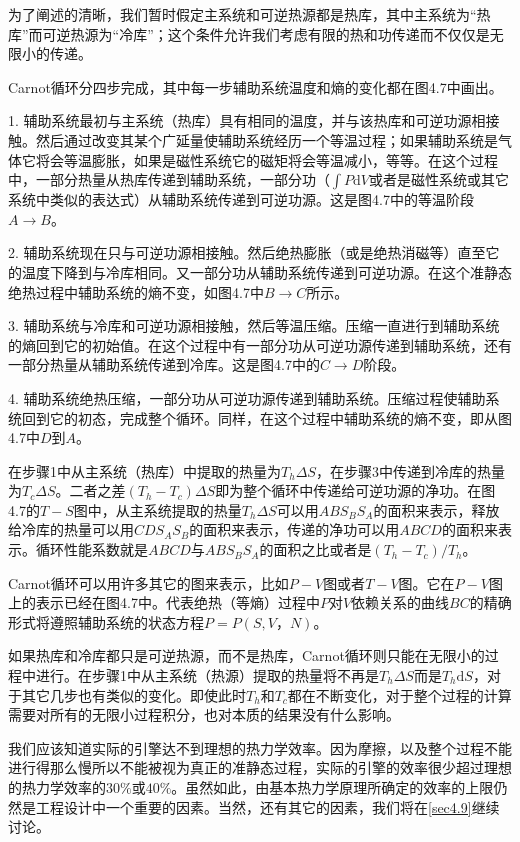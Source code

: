 为了阐述的清晰，我们暂时假定主系统和可逆热源都是热库，其中主系统为“热库”而可逆热源为“冷库”；这个条件允许我们考虑有限的热和功传递而不仅仅是无限小的传递。

Carnot循环分四步完成，其中每一步辅助系统温度和熵的变化都在图4.7中画出。

1. 辅助系统最初与主系统（热库）具有相同的温度，并与该热库和可逆功源相接触。然后通过改变其某个广延量使辅助系统经历一个等温过程；如果辅助系统是气体它将会等温膨胀，如果是磁性系统它的磁矩将会等温减小，等等。在这个过程中，一部分热量从热库传递到辅助系统，一部分功（$\int P\text{d}V$或者是磁性系统或其它系统中类似的表达式）从辅助系统传递到可逆功源。这是图4.7中的等温阶段$A\rightarrow B$。

2. 辅助系统现在只与可逆功源相接触。然后绝热膨胀（或是绝热消磁等）直至它的温度下降到与冷库相同。又一部分功从辅助系统传递到可逆功源。在这个准静态绝热过程中辅助系统的熵不变，如图4.7中$B\rightarrow C$所示。

3. 辅助系统与冷库和可逆功源相接触，然后等温压缩。压缩一直进行到辅助系统的熵回到它的初始值。在这个过程中有一部分功从可逆功源传递到辅助系统，还有一部分热量从辅助系统传递到冷库。这是图4.7中的$C\rightarrow D$阶段。

4. 辅助系统绝热压缩，一部分功从可逆功源传递到辅助系统。压缩过程使辅助系统回到它的初态，完成整个循环。同样，在这个过程中辅助系统的熵不变，即从图4.7中$D$到$A$。

在步骤1中从主系统（热库）中提取的热量为$T_h\Delta S$，在步骤3中传递到冷库的热量为$T_c\Delta S$。二者之差$(T_h - T_c)\Delta S$即为整个循环中传递给可逆功源的净功。在图4.7的$T-S$图中，从主系统提取的热量$T_h\Delta S$可以用$ABS_BS_A$的面积来表示，释放给冷库的热量可以用$CDS_AS_B$的面积来表示，传递的净功可以用$ABCD$的面积来表示。循环性能系数就是$ABCD$与$ABS_BS_A$的面积之比或者是$(T_h - T_c)/T_h$。

Carnot循环可以用许多其它的图来表示，比如$P-V$图或者$T-V$图。它在$P-V$图上的表示已经在图4.7中。代表绝热（等熵）过程中$P$对$V$依赖关系的曲线$BC$的精确形式将遵照辅助系统的状态方程$P = P(S,V，N)$。

如果热库和冷库都只是可逆热源，而不是热库，Carnot循环则只能在无限小的过程中进行。在步骤1中从主系统（热源）提取的热量将不再是$T_h\Delta S$而是$T_h\text{d}S$，对于其它几步也有类似的变化。即使此时$T_h$和$T_c$都在不断变化，对于整个过程的计算需要对所有的无限小过程积分，也对本质的结果没有什么影响。

我们应该知道实际的引擎达不到理想的热力学效率。因为摩擦，以及整个过程不能进行得那么慢所以不能被视为真正的准静态过程，实际的引擎的效率很少超过理想的热力学效率的$30\%$或$40\%$。虽然如此，由基本热力学原理所确定的效率的上限仍然是工程设计中一个重要的因素。当然，还有其它的因素，我们将在\ref{sec4.9}继续讨论。

